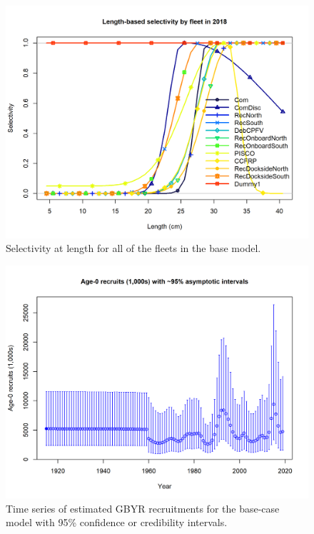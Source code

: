 \documentclass[12pt,]{article}
\begin{document}
\FloatBarrier

\FloatBarrier

\begin{figure}
\centering
\includegraphics{r4ss/plots_mod1/sel01_multiple_fleets_length1.png}
\caption{Selectivity at length for all of the fleets in the base model.
\label{fig:sel01_multiple_fleets_length1}}
\end{figure}

\FloatBarrier

\begin{figure}
\centering
\includegraphics{r4ss/plots_mod1/ts11_Age-0_recruits_(1000s)_with_95_asymptotic_intervals.png}
\caption{Time series of estimated GBYR recruitments for the base-case
model with 95\% confidence or credibility intervals.
\label{fig:Recruit_mod1}}
\end{figure}
\end{document}
